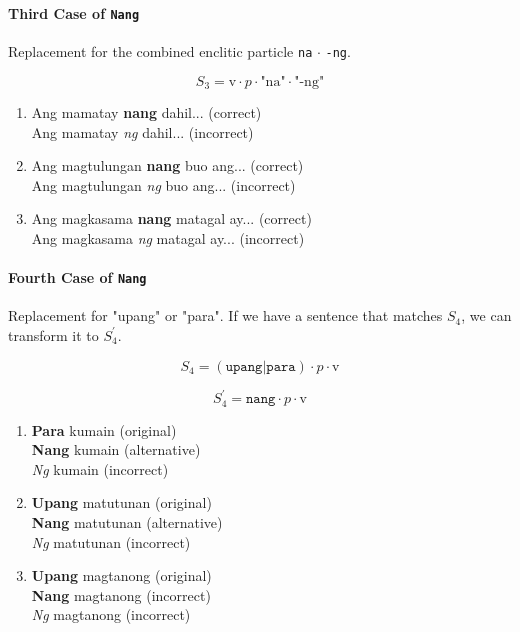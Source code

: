 \paragraph{Third Case of \texttt{Nang}} Replacement for the combined enclitic particle \texttt{na} $\cdot$ \texttt{-ng}.

\[
      S_3 = \text{v} \cdot p \cdot \text{"na"} \cdot \text{"-ng"}
\]

\begin{example}

\end{example}

\begin{enumerate}
      \item Ang mamatay \textbf{nang} dahil... (correct)
            \\ Ang mamatay \textit{ng} dahil... (incorrect)
      \item Ang magtulungan \textbf{nang} buo ang... (correct)
            \\ Ang magtulungan \textit{ng} buo ang... (incorrect)
      \item Ang magkasama \textbf{nang} matagal ay... (correct)
            \\ Ang magkasama \textit{ng} matagal ay... (incorrect)
\end{enumerate}

\paragraph{Fourth Case of \texttt{Nang}} Replacement for "upang" or "para". If we have a sentence that matches $S_4$, we can transform it to $S_4^\prime$.

\[
      S_4 = (\texttt{upang}| \texttt{para}) \cdot p \cdot \text{v}
\]

\[
    S_4^\prime = \texttt{nang} \cdot p \cdot \text{v}
\]

\begin{example}

\end{example}

\begin{enumerate}
    \item \textbf{Para} kumain (original) 
        \\ \textbf{Nang} kumain (alternative) 
        \\ \textit{Ng} kumain (incorrect)
    \item \textbf{Upang} matutunan (original)
        \\ \textbf{Nang} matutunan (alternative)
        \\ \textit{Ng} matutunan (incorrect)
    \item \textbf{Upang} magtanong (original)
        \\ \textbf{Nang} magtanong (incorrect)
        \\ \textit{Ng} magtanong (incorrect)
\end{enumerate}

